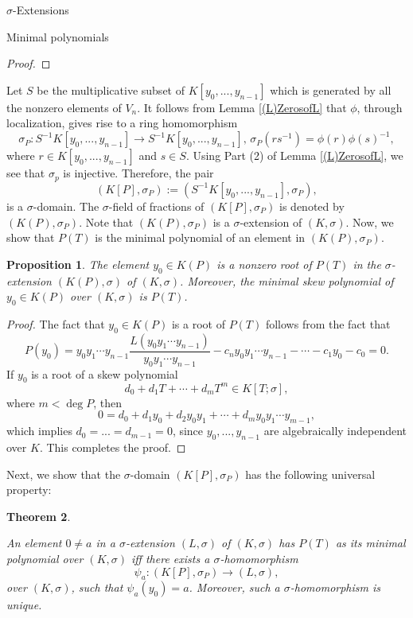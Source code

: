 \documentclass[11pt,a4paper]{article}
\theoremstyle{theorem}
\newtheorem{theorem}{Theorem}[section]
\newtheorem{proposition}[theorem]{Proposition}
\numberwithin{equation}{section}
\newcommand{\s}{\sigma}
\begin{document}
\begin{section}{$\s$-Extensions}
\begin{subsection}{Minimal polynomials}
\begin{proof}
	\end{proof}
	  
	Let $S$ be the multiplicative subset of $K[y_0,...,y_{n-1}]$ which is generated by all the nonzero elements of $V_n$. It follows from  Lemma \ref{(L)ZerosofL} that $\phi$, through localization, gives rise to a ring homomorphism
 	$$\s_P:S^{-1}K[y_0,...,y_{n-1}]\to S^{-1}K[y_0,...,y_{n-1}], \,\s_P(rs^{-1})=\phi(r)\phi(s)^{-1},$$
 	where $r\in K[y_0,...,y_{n-1}]$ and $s\in S$. Using Part (2) of Lemma \ref{(L)ZerosofL}, we see that $\s_p$ is injective. Therefore, the pair
 	$$(K[P],\s_P):=(S^{-1}K[y_0,...,y_{n-1}],\s_P),$$
 	is a $\s$-domain. The $\s$-field of fractions of $(K[P],\s_P)$ is denoted by  $(K(P),\s_P)$. Note that  $(K(P),\s_P)$ is a $\s$-extension of $(K,\s)$. Now, we show that  $P(T)$ is the minimal polynomial of an element in $(K(P),\s_P)$.
	\begin{proposition}\label{(P)rootinK(P)}
		The element  $y_0\in K(P)$ is a nonzero root of $P(T)$ in the $\s$-extension  $(K(P),\s)$ of $(K,\s)$. Moreover, the minimal skew polynomial of  $y_0\in K(P)$ over $(K,\s)$ is $P(T)$.        
	\end{proposition}
	\begin{proof}
		The fact that $y_0\in K(P)$ is a root of $P(T)$ follows from the fact that
		$$P(y_0)=y_{0}y_{1}\cdots y_{n-1}	\frac{L(y_0y_1\cdots y_{n-1})}{y_0y_1\cdots y_{n-1}}-c_{n}y_{0}y_{1}\cdots y_{n-1}-\cdots-c_{1}y_0-c_{0}=0.$$
		 If $y_0$ is a root of a skew polynomial 
		$$d_0+d_1T+\cdots+d_mT^m\in K[T;\sigma],$$
		where $m<\deg P$, then 
		$$0=d_0+d_1y_0+d_2y_0y_1+\cdots+d_my_0y_1\cdots y_{m-1},$$
		which implies $d_0=...=d_{m-1}=0$, since $y_0,...,y_{n-1}$ are algebraically independent over $K$. This completes the proof. 
	\end{proof}
	Next, we show that the $\s$-domain $(K[P],\s_P)$ has the following universal property:
	\begin{theorem}\label{(T)K[P]universal}
		
		 An element $0\neq a$ in a $\s$-extension $(L,\s)$ of $(K,\s)$ has $P(T)$ as its minimal polynomial over $(K,\s)$ iff there exists a  $\s$-homomorphism  $$\psi_a:(K[P],\sigma_P)\to   (L,\s),$$ over $(K,\s)$, such that $\psi_a(y_0)=a$. Moreover, such a $\s$-homomorphism is unique.  
		                	

\end{theorem}
\end{subsection}
\end{section}
\end{document}
